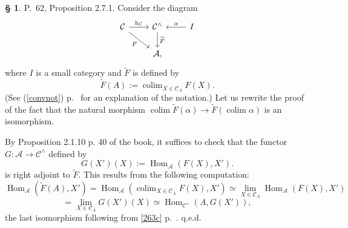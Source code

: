 \documentclass[12pt]{article}%
\theoremstyle{remark}
\theoremstyle{definition}
\newtheorem{s}[thm]{\S}%
\newcommand{\A}{\mathcal A}
\newcommand{\C}{\mathcal C}
\DeclareMathOperator*{\colim}{colim}
\DeclareMathOperator{\hy}{h}
\DeclareMathOperator{\Hom}{Hom}%
\begin{document}
\begin{s}\label{c271b}
P.~62, Proposition 2.7.1. Consider the diagram 
$$
\begin{tikzcd}
\C\ar{r}{\hy_\C}\ar{dr}[swap]{F}&\C^\wedge\ar{d}{\widetilde F}&I\ar{l}[swap]{\alpha}\\
&\A,
\end{tikzcd}
$$
where $I$ is a small category and $\widetilde F$ is defined by 
$$
\widetilde F(A):=\colim_{X\in\C_A}F(X). 
$$
(See (\ref{convnot}) p.~\pageref{convnot} for an explanation of the notation.) Let us rewrite the proof of the fact that the natural morphism $\colim\widetilde F(\alpha)\to\widetilde F\left(\colim\alpha\right)$ is an isomorphism. 

By Proposition 2.1.10 p. 40 of the book, it suffices to check that the functor $G:\A\to\C^\wedge$ defined by 
$$
G(X')(X):=\Hom_{\A}(F(X),X').
$$ 
is right adjoint to $\widetilde F$. This results from the following computation: 
$$
\Hom_{\A}\left(\widetilde F(A),X'\right)=
\Hom_{\A}\left(\colim_{X\in\C_A}F(X),X'\right)\simeq 
\lim_{X\in\C_A}\Hom_{\A}(F(X),X')
$$
$$
=\lim_{X\in\C_A}G(X')(X)\simeq\Hom_{\C^\wedge}(A,G(X')), 
$$ 
the last isomorphism following from \eqref{263c} p.~\pageref{263c}. q.e.d.
\end{s}

%
\end{document}
